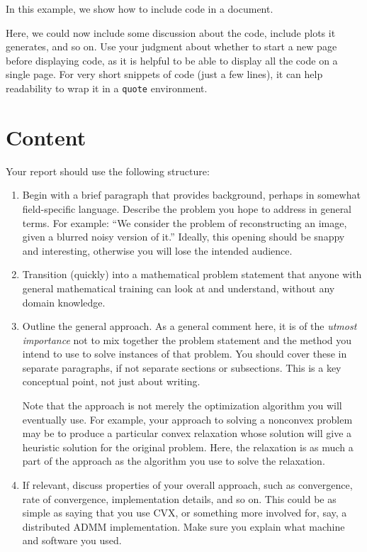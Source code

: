 \documentclass[12pt]{article}
\begin{document}
In this example, we show how to include code in a document.

Here, we could now include some discussion about the code, include plots it
generates, and so on. Use your judgment about whether to start a new page
before displaying code, as it is helpful to be able to display all the code on
a single page. For very short snippets of code (just a few lines), it can help
readability to wrap it in a \texttt{quote} environment.

\section{Content} 
\label{s-content}

Your report should use the following structure:

\begin{enumerate}
\item Begin with a brief paragraph that provides background, perhaps in
somewhat field-specific language.  Describe the problem you hope to address
in general terms.  For example:  ``We consider the problem of
reconstructing an image, given a blurred noisy version of it.'' Ideally,
this opening should be snappy and interesting, otherwise you will lose the
intended audience.

\item Transition (quickly) into a mathematical problem statement that
anyone with general mathematical training can look at and understand,
without any domain knowledge.

\item Outline the general approach. As a general comment here, it is of the
\emph{utmost importance} not to mix together the problem statement and the
method you intend to use to solve instances of that problem. You should cover
these in separate paragraphs, if not separate sections or subsections. This is
a key conceptual point, not just about writing.

Note that the approach is not merely the optimization algorithm you will
eventually use. For example, your approach to solving a nonconvex problem may
be to produce a particular convex relaxation whose solution will give a
heuristic solution for the original problem. Here, the relaxation is as much a
part of the approach as the algorithm you use to solve the relaxation.

\item If relevant, discuss properties of your overall approach, such
as convergence, rate of convergence, implementation details, and so on.
This could be as simple as saying that you use CVX,
or something more involved for, say, a distributed ADMM implementation.
Make sure you explain what machine and software you used.


\end{enumerate}
\end{document}
